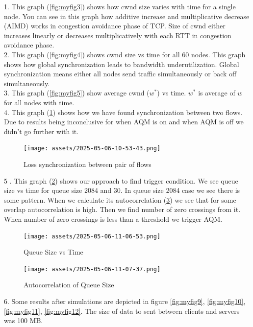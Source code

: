 1. This graph (\ref{fig:myfig3}) shows how cwnd size varies with time for a single node. You can see in this graph how additive increase and multiplicative decrease (AIMD) works in congestion avoidance phase of TCP. Size of cwnd either increases linearly or decreases multiplicatively with each RTT in congestion avoidance phase.\\ %
2. This graph (\ref{fig:myfig4}) shows cwnd size vs time for all 60 nodes. This graph shows how global synchronization leads to bandwidth underutilization. Global synchronization means either all nodes send traffic simultaneously or back off simultaneously. \\ %
3. This graph (\ref{fig:myfig5}) show average cwnd ($ w^* $) vs time. $ w^* $ is average of $ w $ for all nodes with time. \\ %
4. This graph (\ref{fig:myfig6}) shows how we have found synchronization between two flows. Due to results being inconclusive for when AQM is on and when AQM is off we didn't go further with it. \\ 

\begin{figure}[h]
  \centering
  \texttt{[image: assets/2025-05-06-10-53-43.png]}
  \caption{Loss synchronization between pair of flows}
  \label{fig:myfig6}
\end{figure}
5 . This graph (\ref{fig:myfig7}) shows our approach to find trigger condition. We see queue size vs time for queue size 2084 and 30. In queue size 2084 case we see there is some pattern. When we calculate its autocorrelation (\ref{fig:myfig8}) we see that for some overlap autocorrelation is high. Then we find number of zero crossings from it. When number of zero crossings is less than a threshold we trigger AQM. \\ 


\begin{figure}[h]
  \centering
  \texttt{[image: assets/2025-05-06-11-06-53.png]}
  \caption{Queue Size vs Time}
  \label{fig:myfig7}
\end{figure}

\begin{figure}[h]
  \centering
  \texttt{[image: assets/2025-05-06-11-07-37.png]}
  \caption{Autocorrelation of Queue Size}
  \label{fig:myfig8}
\end{figure}

6. Some results after simulations are depicted in figure \ref{fig:myfig9}, \ref{fig:myfig10}, \ref{fig:myfig11}, \ref{fig:myfig12}. The size of data to sent between clients and servers was 100 MB. \\ 

